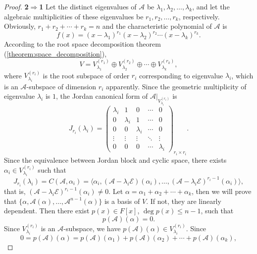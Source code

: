\documentclass[11pt]{../../TexTemplate/elegantbook} %
\begin{document}
\begin{proof}
{\color{blue!60}\textbf{2}\(\Rightarrow\)\textbf{1}}
Let the distinct eigenvalues of \( \mathcal{A} \) be \( \lambda_1, \lambda_2, \dots, \lambda_k \),
and let the algebraic multiplicities of these eigenvalues be \( r_1, r_2, \dots, r_k \), respectively.
Obviously, \( r_1 + r_2 + \cdots + r_k = n \) and the characteristic polynomial of \( \mathcal{A} \) is
\[
f(x) = (x - \lambda_1)^{r_1} (x - \lambda_2)^{r_2} \cdots (x - \lambda_k)^{r_k}.
\]
According to the root space decomposition theorem (\ref{theorem:space_decomposition}),
\[
V = V_{\lambda_1}^{(r_1)} \oplus V_{\lambda_2}^{(r_2)} \oplus \cdots \oplus V_{\lambda_k}^{(r_k)},
\]
where \( V_{\lambda_i}^{(r_i)}\) is the root subspace of order \( r_i \) corresponding to eigenvalue \( \lambda_i \),
which is an \( \mathcal{A} \)-subspace of dimension \( r_i \) apparently.
\newline Since the geometric multiplicity of eigenvalue \( \lambda_i \) is \( 1 \),
the Jordan canonical form of \( \mathcal{A}|_{V_{\lambda_i}^{(r_i)}} \) is
\[
J_{r_i}(\lambda_i) = \begin{pmatrix}
\lambda_i & 1 & 0 & \cdots & 0 \\
0 & \lambda_i & 1 & \cdots & 0 \\
0 & 0 & \lambda_i & \cdots & 0 \\
\vdots & \vdots & \vdots & \ddots & \vdots\\
0 & 0 & 0 & \cdots & \lambda_i
\end{pmatrix}_{r_i \times r_i}.
\]
Since the equivalence between Jordan block and cyclic space,
there exists \(\alpha_{i}\in V_{\lambda_i}^{(r_i)}\) such that
\[
J_{r_i}(\lambda_i) = C(\mathcal{A}, \alpha_{i}) 
= \langle \alpha_{i}, (\mathcal{A} - \lambda_i \mathcal{E})(\alpha_{i}), \ldots, 
(\mathcal{A} - \lambda_i \mathcal{E})^{r_i - 1}(\alpha_{i}) \rangle,
\]
that is, \((\mathcal{A} - \lambda_i \mathcal{E})^{r_i - 1}(\alpha_{i}) \neq 0\).
\newline Let \(\alpha = \alpha_{1} + \alpha_{2} + \cdots + \alpha_{k}\),
then we will prove that \(\{ \alpha, \mathcal{A}(\alpha), \ldots, \mathcal{A}^{n-1}(\alpha) \}\)
is a basis of \( V \).
\newline If not, they are linearly dependent.
Then there exist \( p(x) \in F[x] \), \(\operatorname{deg} p(x) \leqslant  n-1\), such that
\[
p(\mathcal{A})(\alpha) = 0.
\]
Since \(V_{\lambda_i}^{(r_i)}\) is an \( \mathcal{A} \)-subspace, we have 
\(p(\mathcal{A})(\alpha) \in V_{\lambda_i}^{(r_i)}\).
\newline Since 
\[
0 = p(\mathcal{A})(\alpha) = p(\mathcal{A})(\alpha_{1}) + p(\mathcal{A})(\alpha_{2}) + \cdots + p(\mathcal{A})(\alpha_{k}),
\]
\end{proof}
\end{document}
